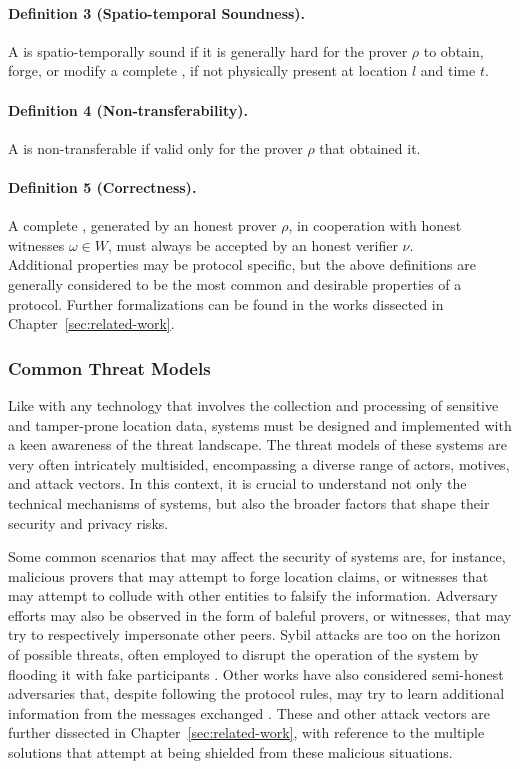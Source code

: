 \paragraph{Definition 3 (Spatio-temporal Soundness).} A \pol{} is spatio-temporally sound if it is generally hard for the prover $\rho$ to obtain, forge, or modify a complete \pol{}, if not physically present at location $l$ and time $t$.

\paragraph{Definition 4 (Non-transferability).} A \pol{} is non-transferable if valid only for the prover $\rho$ that obtained it.

\paragraph{Definition 5 (Correctness).} A complete \pol{}, generated by an honest prover $\rho$, in cooperation with honest witnesses $\omega \in W$, must always be accepted by an honest verifier $\nu$.\\

Additional properties may be protocol specific, but the above definitions are generally considered to be the most common and desirable properties of a \pol{} protocol. Further formalizations can be found in the works dissected in Chapter~\ref{sec:related-work}.

\subsubsection{Common Threat Models}

Like with any technology that involves the collection and processing of sensitive and tamper-prone location data, \pol{} systems must be designed and implemented with a keen awareness of the threat landscape. The threat models of these systems are very often intricately multisided, encompassing a diverse range of actors, motives, and attack vectors. In this context, it is crucial to understand not only the technical mechanisms of \pol{} systems, but also the broader factors that shape their security and privacy risks. 

Some common scenarios that may affect the security of \pol{} systems are, for instance, malicious provers that may attempt to forge location claims, or witnesses that may attempt to collude with other entities to falsify the information. Adversary efforts may also be observed in the form of baleful provers, or witnesses, that may try to respectively impersonate other peers. Sybil attacks are too on the horizon of possible threats, often employed to disrupt the operation of the system by flooding it with fake participants \cite{nasrulin2018robust}. Other works have also considered semi-honest adversaries that, despite following the protocol rules, may try to learn additional information from the messages exchanged \cite{dupin2018location}. These and other attack vectors are further dissected in Chapter~\ref{sec:related-work}, with reference to the multiple solutions that attempt at being shielded from these malicious situations.

